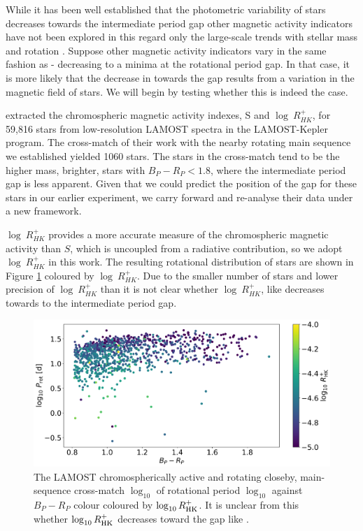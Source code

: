 While it has been well established that the photometric variability of stars decreases towards the intermediate period gap other magnetic activity indicators have not been explored in this regard only the large-scale trends with stellar mass and rotation \citep{zhang_magnetic_2020}.
Suppose other magnetic activity indicators vary in the same fashion as \rper{} - decreasing to a minima at the rotational period gap. 
In that case, it is more likely that the decrease in \rper{} towards the gap results from a variation in the magnetic field of stars.
We will begin by testing whether this is indeed the case.

\citet{zhang_magnetic_2020} extracted the chromospheric magnetic activity indexes, S and $\log \ R^{+}_{HK}$, for 59,816 stars from low-resolution LAMOST spectra in the LAMOST-Kepler program.
The cross-match of their work with the nearby rotating main sequence we established yielded 1060 stars.
The stars in the cross-match tend to be the higher mass, brighter, stars with $B_P-R_P<1.8$, where the intermediate period gap is less apparent.
Given that we could predict the position of the gap for these stars in our earlier experiment, we carry forward and re-analyse their data under a new framework.

$\log \ R^{+}_{HK}$ provides a more accurate measure of the chromospheric magnetic activity than $S$, which is uncoupled from a radiative contribution, so we adopt $\log \ R^{+}_{HK}$ in this work.
The resulting rotational distribution of stars are shown in Figure \ref{fig:rot_dist_rhk} coloured by $\log \ R^{+}_{HK}$.
Due to the smaller number of stars and lower precision of $\log \ R^{+}_{HK}$ than \rper{} it is not clear whether $\log \ R^{+}_{HK}$, like \rper{} decreases towards to the intermediate period gap.


\begin{figure}
\centering
    \includegraphics[width=\textwidth]{Figures/rot_gap_figures/rotational_dist_rhk.png}
    \caption{
    The LAMOST chromospherically active and \kepler{} rotating closeby, main-sequence cross-match $\log_{10}$ of rotational period $\log_10$ against \gaia $B_P-R_P$ colour coloured by $\log_{10}R^{+}_{\rm{HK}}$. It is unclear from this whether $\log_{10}R^{+}_{\rm{HK}}$ decreases toward the gap like \rper{}.}
    \label{fig:rot_dist_rhk}
\end{figure}

